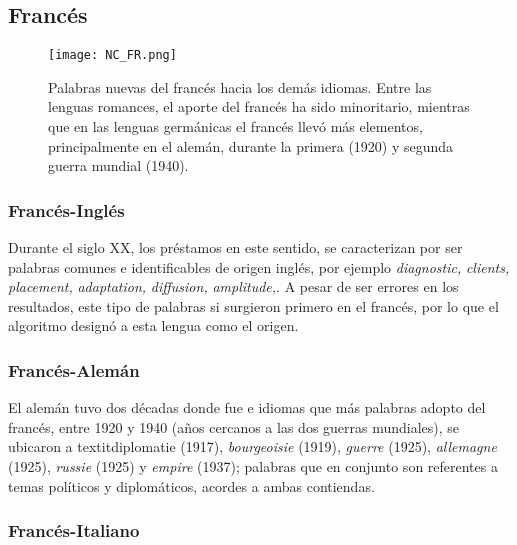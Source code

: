 
\subsection{Francés} %

\begin{figure}[h!]
	\centering
	\texttt{[image: NC\_FR.png]}
	\caption{Palabras nuevas del francés hacia los demás idiomas. Entre las lenguas romances, el aporte del francés ha sido minoritario, mientras que en las lenguas germánicas el francés llevó más elementos, principalmente en el alemán, durante la primera (1920) y segunda guerra mundial (1940).}
	\label{fig.NC_FR}
	
	
\end{figure}

\subsubsection*{Francés-Inglés}%

Durante el siglo XX, los préstamos en este sentido, se caracterizan por ser palabras comunes e identificables de origen inglés,  por ejemplo  \textit{diagnostic,} \textit{clients,} \textit{placement,} \textit{adaptation,} \textit{diffusion,} \textit{amplitude,}.  A pesar de ser errores en los resultados, este tipo de palabras si surgieron primero en el francés, por lo que el algoritmo designó a esta lengua como el origen. 

\subsubsection*{Francés-Alemán}%

El alemán tuvo dos décadas donde  fue e idiomas que más palabras adopto del francés, entre 1920 y 1940  (años cercanos a las dos guerras mundiales), se ubicaron a  textit{diplomatie} (1917), \textit{bourgeoisie} (1919),  \textit{guerre} (1925), \textit{allemagne} (1925), \textit{russie} (1925) y \textit{empire} (1937); palabras que en conjunto son referentes a temas políticos y diplomáticos, acordes a ambas contiendas. 


\subsubsection*{Francés-Italiano}%

